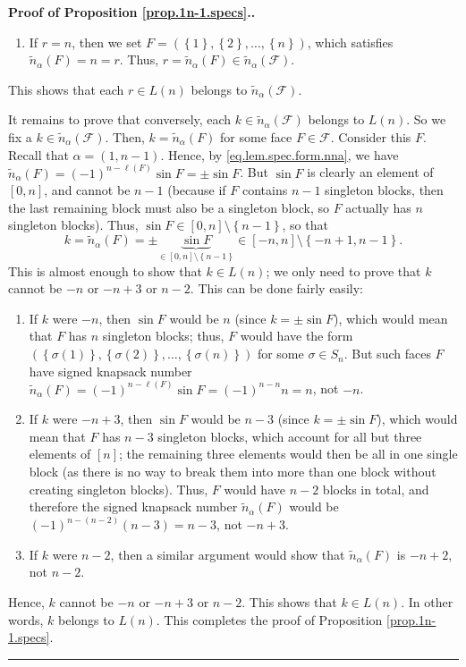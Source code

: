 \documentclass[12pt]{article}
\theoremstyle{definition}%
\theoremstyle{definition}%
\theoremstyle{remark}%
\newcommand{\tup}[1]{\left( #1 \right)}
\newcommand{\interval}[1]{\left[ #1 \right]} %
\newcommand{\set}[1]{\left\{ #1 \right\}}
\newcommand{\CF}{\mathcal{F}}
\newcommand{\nna}{\widetilde{n}_{ \alpha } }%
\newenvironment{proof}[1][Proof]{\noindent\textbf{#1.} }{\ \rule{0.5em}{0.5em}}
\begin{document}
\begin{proof}[Proof of Proposition \ref{prop.1n-1.specs}.]
\begin{enumerate}
\item If $r = n$, then we set $F = \left(  \set{1}, \set{2},
\ldots, \set{n}  \right)  $, which satisfies
$\nna\tup{F} =n=r$.
Thus, $r = \nna\tup{F} \in \nna\tup{\CF}$.
\end{enumerate}

This shows that each $r \in L\tup{n}$ belongs to
$\nna\tup{\CF}$.

It remains to prove that conversely, each $k \in \nna\tup{\CF}$
belongs to $L\tup{n}$. So we fix a $k \in \nna\tup{\CF}$. Then,
$k=\nna\tup{F} $ for some face $F\in \CF$. Consider this $F$.
Recall that $\alpha = \tup{1, n-1}$.
Hence, by \eqref{eq.lem.spec.form.nna}, we have
$\nna\tup{F} = \tup{-1}^{n-\ell\tup{F} }\sin F = \pm\sin F$.
But $\sin F$ is
clearly an element of $\interval{0, n}$, and cannot be $n-1$ (because if
$F$ contains $n-1$ singleton blocks, then the last remaining block must also be
a singleton block, so $F$ actually has $n$ singleton blocks). Thus, $\sin
F\in \interval{0, n}  \setminus \set{n-1} $, so that
\[
k = \nna\tup{F}
= \pm \underbrace{\sin F}_{\in \interval{0, n} \setminus \set{ n-1 } }
\in \interval{-n, n} \setminus \set{ -n+1,n-1 } .
\]
This is almost enough to show that $k\in L\left(  n\right)$; we only need to
prove that $k$ cannot be $-n$ or $-n+3$ or $n-2$. This can be done fairly easily:

\begin{enumerate}
\item If $k$ were $-n$, then $\sin F$ would be $n$ (since $k=\pm\sin F$), which
would mean that $F$ has $n$ singleton blocks; thus, $F$ would have the form
$\left(  \set{\sigma\tup{1}}  ,\set{\sigma\tup{2}}  ,\ldots,\set{\sigma\tup{n}}
\right)$ for some $\sigma \in S_n$.
But such faces $F$ have signed knapsack number
$\nna\tup{F} = \tup{-1}^{n-\ell\tup{F} }\sin F
= \tup{-1}^{n-n} n = n$, not $-n$.

\item If $k$ were $-n+3$, then $\sin F$ would be $n-3$ (since $k=\pm\sin F$),
which would mean that $F$ has $n-3$ singleton blocks, which account for all
but three elements of $\interval{n}$; the remaining three elements would
then be all in one single block (as there is no way to break them into more
than one block without creating singleton blocks). Thus, $F$ would have $n-2$
blocks in total, and therefore the signed knapsack number $\nna \tup{F}$
would be $\tup{-1}^{n-\left(  n-2\right)
}\left(  n-3\right)  =n-3$, not $-n+3$.

\item If $k$ were $n-2$, then a similar argument would show that
$\nna \tup{F}$ is $-n+2$, not $n-2$.
\end{enumerate}

Hence, $k$ cannot be $-n$ or $-n+3$ or $n-2$. This shows that $k\in L\left(
n\right)$.
In other words, $k$ belongs to $L\tup{n}$.
This completes the proof of Proposition \ref{prop.1n-1.specs}.
\end{proof}
\end{document}

